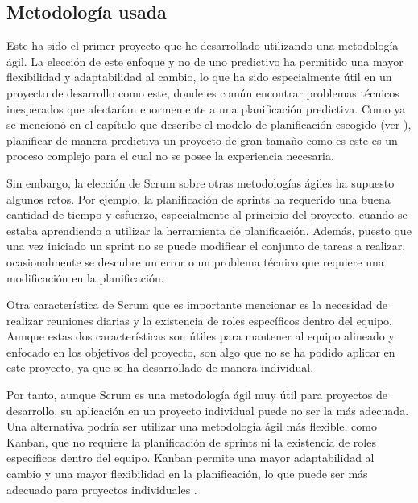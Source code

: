 \subsection{Metodología usada}
Este ha sido el primer proyecto que he desarrollado utilizando una metodología ágil.
La elección de este enfoque y no de uno predictivo ha permitido una mayor flexibilidad y adaptabilidad
al cambio, lo que ha sido especialmente útil en un proyecto de desarrollo como este, donde es
común encontrar problemas técnicos inesperados que afectarían enormemente a una planificación
predictiva. Como ya se mencionó en el capítulo que describe el modelo de planificación escogido
(ver ), planificar de manera predictiva un proyecto de gran tamaño
como es este es un proceso complejo para el cual no se posee la experiencia necesaria.

Sin embargo, la elección de Scrum sobre otras metodologías ágiles ha supuesto algunos retos. Por
ejemplo, la planificación de sprints ha requerido una buena cantidad de tiempo y esfuerzo,
especialmente al principio del proyecto, cuando se estaba aprendiendo a utilizar la herramienta
de planificación. Además, puesto que una vez iniciado un sprint no se puede modificar el conjunto
de tareas a realizar, ocasionalmente se descubre un error o un problema técnico que requiere una
modificación en la planificación.

Otra característica de Scrum que es importante mencionar es la necesidad de realizar reuniones
diarias y la existencia de roles específicos dentro del equipo. Aunque estas dos características
son útiles para mantener al equipo alineado y enfocado en los objetivos del proyecto, son algo
que no se ha podido aplicar en este proyecto, ya que se ha desarrollado de manera individual.

Por tanto, aunque Scrum es una metodología ágil muy útil para proyectos de desarrollo, su
aplicación en un proyecto individual puede no ser la más adecuada. Una alternativa podría
ser utilizar una metodología ágil más flexible, como Kanban, que no requiere la planificación
de sprints ni la existencia de roles específicos dentro del equipo. Kanban permite una mayor
adaptabilidad al cambio y una mayor flexibilidad en la planificación, lo que puede ser más adecuado
para proyectos individuales \parencite{junior2010variations}.


